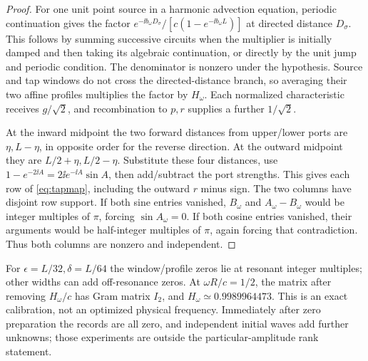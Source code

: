 \begin{proof}
For one unit point source in a harmonic advection equation, periodic continuation gives the factor $e^{-\ii b_\omega D_\sigma}/[c(1-e^{-\ii b_\omega L})]$ at directed distance $D_\sigma$. This follows by summing successive circuits when the multiplier is initially damped and then taking its algebraic continuation, or directly by the unit jump and periodic condition. The denominator is nonzero under the hypothesis. Source and tap windows do not cross the directed-distance branch, so averaging their two affine profiles multiplies the factor by $H_\omega$. Each normalized characteristic receives $g/\sqrt2$, and recombination to $p,r$ supplies a further $1/\sqrt2$.

At the inward midpoint the two forward distances from upper/lower ports are $\eta,L-\eta$, in opposite order for the reverse direction. At the outward midpoint they are $L/2+\eta,L/2-\eta$. Substitute these four distances, use $1-e^{-2\ii A}=2\ii e^{-\ii A}\sin A$, then add/subtract the port strengths. This gives each row of \eqref{eq:tapmap}, including the outward $r$ minus sign. The two columns have disjoint row support. If both sine entries vanished, $B_\omega$ and $A_\omega-B_\omega$ would be integer multiples of $\pi$, forcing $\sin A_\omega=0$. If both cosine entries vanished, their arguments would be half-integer multiples of $\pi$, again forcing that contradiction. Thus both columns are nonzero and independent.
\end{proof}

For $\epsilon=L/32,\delta=L/64$ the window/profile zeros lie at resonant integer multiples; other widths can add off-resonance zeros. At $\omega R/c=1/2$, the matrix after removing $H_\omega/c$ has Gram matrix $I_2$, and $H_\omega\simeq0.9989964473$. This is an exact calibration, not an optimized physical frequency. Immediately after zero preparation the records are all zero, and independent initial waves add further unknowns; those experiments are outside the particular-amplitude rank statement.

